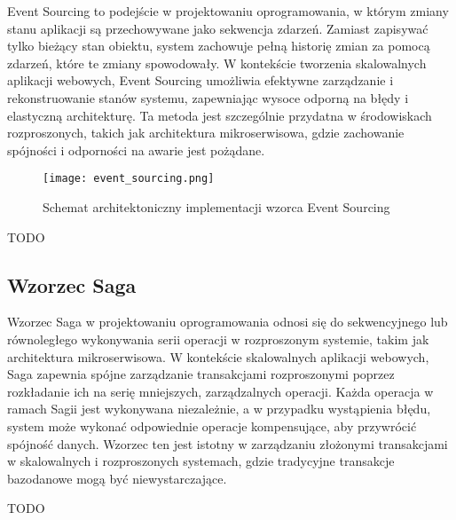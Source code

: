 Event Sourcing to podejście w projektowaniu oprogramowania, w którym zmiany stanu aplikacji są przechowywane jako sekwencja zdarzeń. Zamiast zapisywać tylko bieżący stan obiektu, system zachowuje pełną historię zmian za pomocą zdarzeń, które te zmiany spowodowały. W kontekście tworzenia skalowalnych aplikacji webowych, Event Sourcing umożliwia efektywne zarządzanie i rekonstruowanie stanów systemu, zapewniając wysoce odporną na błędy i elastyczną architekturę. Ta metoda jest szczególnie przydatna w środowiskach rozproszonych, takich jak architektura mikroserwisowa, gdzie zachowanie spójności i odporności na awarie jest pożądane.

\begin{figure}[!h]
    \centering \texttt{[image: event\_sourcing.png]}
    \caption{Schemat architektoniczny implementacji wzorca Event Sourcing}
\end{figure}

TODO

\subsection{Wzorzec Saga}

Wzorzec Saga w projektowaniu oprogramowania odnosi się do sekwencyjnego lub równoległego wykonywania serii operacji w rozproszonym systemie, takim jak architektura mikroserwisowa. W kontekście skalowalnych aplikacji webowych, Saga zapewnia spójne zarządzanie transakcjami rozproszonymi poprzez rozkładanie ich na serię mniejszych, zarządzalnych operacji. Każda operacja w ramach Sagii jest wykonywana niezależnie, a w przypadku wystąpienia błędu, system może wykonać odpowiednie operacje kompensujące, aby przywrócić spójność danych. Wzorzec ten jest istotny w zarządzaniu złożonymi transakcjami w skalowalnych i rozproszonych systemach, gdzie tradycyjne transakcje bazodanowe mogą być niewystarczające.

TODO